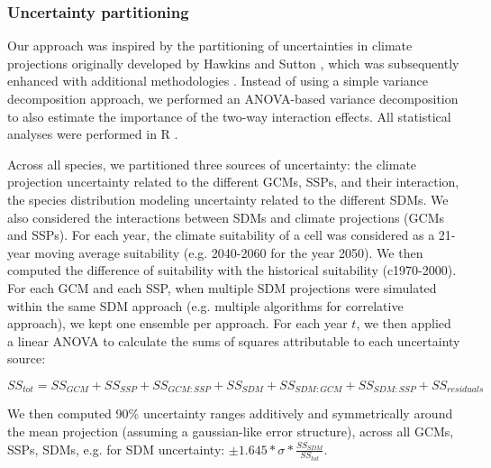 \documentclass[11pt,letter]{article}
\begin{document}
\subsubsection*{Uncertainty partitioning}

Our approach was inspired by the partitioning of uncertainties in climate projections originally developed by Hawkins and Sutton \citep{Hawkins2009, Hawkins2011}, which was subsequently enhanced with additional methodologies \citep{Yip2011, Lafferty2023}. Instead of using a simple variance decomposition approach, we performed an ANOVA-based variance decomposition to also estimate the importance of the two-way interaction effects. All statistical analyses were performed in R \citep{RCT2024}.

Across all species, we partitioned three sources of uncertainty: the climate projection uncertainty related to the different GCMs, SSPs, and their interaction, the species distribution modeling uncertainty related to the different SDMs. We also considered the interactions between SDMs and climate projections (GCMs and SSPs). For each year, the climate suitability of a cell was considered as a 21-year moving average suitability (e.g. 2040-2060 for the year 2050). We then computed the difference of suitability with the historical suitability (c1970-2000). For each GCM and each SSP, when multiple SDM projections were simulated within the same SDM approach (e.g. multiple algorithms for correlative approach), we kept one ensemble per approach. For each year $t$, we then applied a linear ANOVA to calculate the sums of squares attributable to each uncertainty source:

$$
{SS}_{tot} = {SS}_{GCM} + {SS}_{SSP} + {SS}_{GCM:SSP} + {SS}_{SDM} + {SS}_{SDM:GCM} + {SS}_{SDM:SSP} + {SS}_{residuals}
$$

We then computed 90\% uncertainty ranges additively and symmetrically around the mean projection (assuming a gaussian-like error structure), across all GCMs, SSPs, SDMs, e.g. for SDM uncertainty: $\pm1.645*\sigma*\frac{{SS}_{SDM}}{{SS}_{tot}}$.

\clearpage


\end{document}
